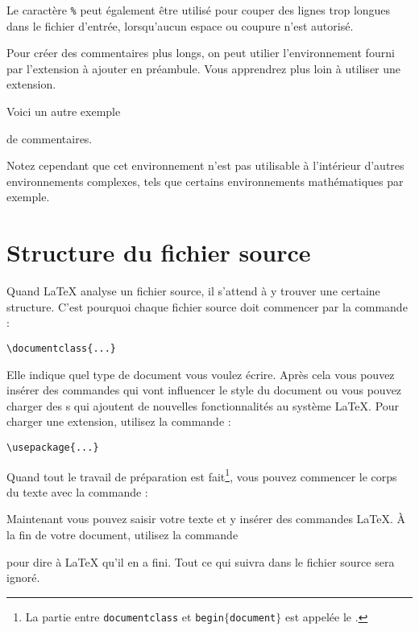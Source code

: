 Le caractère \verb|%| peut également être utilisé pour couper des
lignes trop longues dans le fichier d'entrée, lorsqu'aucun espace ou
coupure n'est autorisé.

Pour créer des commentaires plus longs, on peut utilier
l'environnement  fourni par l'extension  à
ajouter en préambule.  Vous apprendrez plus loin à utiliser une
extension.

\begin{example}
Voici un autre exemple
\begin{comment}
Limité mais démonstratif
\end{comment}
de commentaires.
\end{example}

Notez cependant que cet environnement n'est pas utilisable à
l'intérieur d'autres environnements complexes, tels que certains
environnements mathématiques par exemple.

\section{Structure du fichier source}
\label{sec:structure}

Quand \LaTeX{} analyse un fichier source, il s'attend à y trouver une
certaine structure. C'est pourquoi chaque fichier source doit
commencer par la commande :
\begin{code}
\verb|\documentclass{...}|
\end{code}
Elle indique quel type de document vous voulez écrire. Après cela vous
pouvez insérer des commandes qui vont influencer le style du document
ou vous pouvez charger des s qui ajoutent de nouvelles
fonctionnalités au système \LaTeX{}. Pour charger une extension,
utilisez la commande :
\begin{code}
\verb|\usepackage{...}|
\end{code}

Quand tout le travail de préparation est fait\footnote{La partie entre
\texttt{\bs{}documentclass} et
\texttt{\bs{}begin$\mathtt{\{}$document$\mathtt{\}}$} est appelée le
\emph{}.}, vous pouvez commencer le corps du texte avec
la commande :
\begin{code}
\verb||
\end{code}

Maintenant vous pouvez saisir votre texte et y insérer des commandes
\LaTeX{}. À la fin de votre document, utilisez la commande
\begin{code}
\verb||
\end{code}
pour dire à \LaTeX{} qu'il en a fini. Tout ce qui suivra dans le
fichier source sera ignoré.

